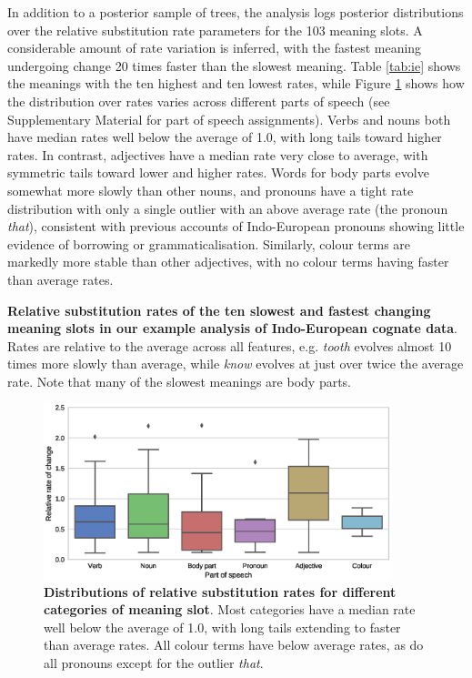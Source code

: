 \documentclass[10pt,a4paper]{article}
\begin{document}
In addition to a posterior sample of trees, the analysis logs posterior distributions over the relative substitution rate parameters for the 103 meaning slots.  A considerable amount of rate variation is inferred, with the fastest meaning undergoing change 20 times faster than the slowest meaning.  Table \ref{tab:ie} shows the meanings with the ten highest and ten lowest rates, while Figure \ref{fig:ie_rates} shows how the distribution over rates varies across different parts of speech (see Supplementary Material for part of speech assignments).  Verbs and nouns both have median rates well below the average of 1.0, with long tails toward higher rates.  In contrast, adjectives have a median rate very close to average, with symmetric tails toward lower and higher rates.  Words for body parts evolve somewhat more slowly than other nouns, and pronouns have a tight rate distribution with only a single outlier with an above average rate (the pronoun \emph{that}), consistent with previous accounts of Indo-European pronouns showing little evidence of borrowing or grammaticalisation\cite{Muysken2008}.  Similarly, colour terms are markedly more stable than other adjectives, with no colour terms having faster than average rates.

\begin{table}[t]
	\begin{center}
		
	\end{center}
	\caption{\textbf{Relative substitution rates of the ten slowest and fastest changing meaning slots in our example analysis of Indo-European cognate data}.  Rates are relative to the average across all features, e.g. \emph{tooth} evolves almost 10 times more slowly than average, while \emph{know} evolves at just over twice the average rate.  Note that many of the slowest meanings are body parts.}
\label{tab:ie}
\end{table}

\begin{figure}[t]
	\begin{center}
	\includegraphics[width=0.90\textwidth]{examples/indoeuropean/category_rates.eps}
	\end{center}
	\caption{\textbf{Distributions of relative substitution rates for different categories of meaning slot}.  Most categories have a median rate well below the average of 1.0, with long tails extending to faster than average rates.  All colour terms have below average rates, as do all pronouns except for the outlier \emph{that}.}
\label{fig:ie_rates}
\end{figure}
\end{document}
